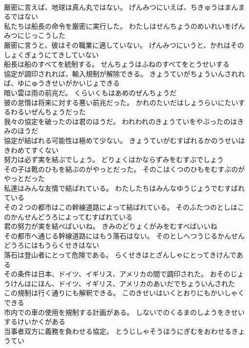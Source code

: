 \documentclass[8pt]{extreport}
\begin{document}
\begin{CJK}{UTF8}{min}
\\	厳密に言えば、地球は真ん丸ではない。	げんみつにいえば、ちきゅうはまんまるではない 
\\	私たちは船長の命令を厳密に実行した。	わたしはせんちょうのめいれいをげんみつにじっこうした 
\\	厳密に言うと、彼はその職業に適していない。	げんみつにいうと、かれはそのしょくぎょうにてきしていない 
\\	船長は船のすべてを統制する。	せんちょうはふねのすべてをとうせいする 
\\	協定が調印されれば、輸入規制が解除できる。	きょうていがちょういんされれば、ゆにゅうきせいがかいじょできる 
\\	暗い雲は雨の前兆だ。	くらいくもはあめのぜんちょうだ 
\\	彼の怠惰は将来に対する悪い前兆だった。	かれのたいだはしょうらいにたいするわるいぜんちょうだった 
\\	我々の協定を破ったのは君のほうだ。	われわれのきょうていをやぶったのはきみのほうだ 
\\	協定が結ばれる可能性は極めて少ない。	きょうていがむすばれるかのうせいはきわめてすくない 
\\	努力は必ず実を結ぶでしょう。	どりょくはかならずみをむすぶでしょう 
\\	その子は靴のひもを結ぶのがやっとだった。	そのこはくつのひもをむすぶのがやっとだった 
\\	私達はみんな友情で結ばれている。	わたしたちはみんなゆうじょうでむすばれている 
\\	その２つの都市はこの幹線道路によって結ばれている。	そのふたつのとしはこのかんせんどうろによってむすばれている 
\\	君の努力が実を結べばいいね。	きみのどりょくがみをむすべばいいね 
\\	その都市へ通じる幹線道路にはもう落石はない。	そのとしへつうじるかんせんどうろにはもうらくせきはない 
\\	落石は登山者にとって危険である。	らくせきはとざんしゃにとってきけんである 
\\	その条件は日本、ドイツ、イギリス、アメリカの間で調印された。	おそのじょうけんはにほん、ドイツ、イギリス、アメリカのあいだでちょういんされた 
\\	この規制は行く通りにも解釈できる。	このきせいはいくとおりにもかいしゃくできる 
\\	市内での車の使用を規制する計画がある。	しないでのくるまのしようをきせいするけいかくがある 
\\	当事者双方に義務を負わせる協定。	とうじしゃそうほうにぎむをおわせるきょうてい 

\end{CJK}
\end{document}
